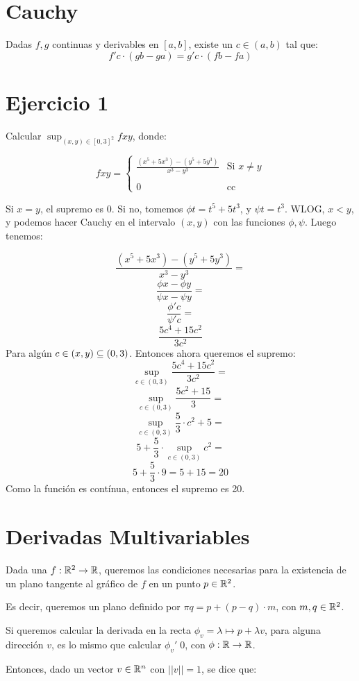\documentclass{article}
\begin{document}
\section*{Cauchy}
Dadas $f, g$ continuas y derivables en $[a, b]$, existe un $c \in (a, b)$ tal
que:
\[f'c \cdot (gb - ga) = g'c \cdot (fb - fa)\]

\section*{Ejercicio 1}
Calcular $\sup_{(x,y) \in [0,3]^2} fxy$, donde:

\[
	fxy =
	\begin{cases}
		\frac{(x^5 + 5x^3) - (y^5 + 5y^3)}{x^3 - y^3} & \text{Si $x \neq y$} \\
		\\
		0 & \text{cc}
	\end{cases}
\]

Si $x = y$, el supremo es $0$. Si no, tomemos $\phi t = t^5+5t^3$, y $\psi t =
t^3$. WLOG, $x < y$, y podemos hacer Cauchy en el intervalo $(x, y)$ con las
funciones $\phi, \psi$. Luego tenemos:

\[
	\frac{(x^5 + 5x^3) - (y^5 + 5y^3)}{x^3 - y^3} =
\]
\[
	\frac{\phi x - \phi y}{\psi x - \psi y} =
\]
\[
	\frac{\phi' c}{\psi' c} =
\]
\[
	\frac{5c^4+15c^2}{3c^2}
\]
Para algún $c \in (x, y) \subseteq (0, 3)$. Entonces ahora queremos el supremo:
\[
	\sup_{c \in (0,3)}\frac{5c^4+15c^2}{3c^2} =
\]
\[
	\sup_{c \in (0,3)}\frac{5c^2+15}{3} =
\]
\[
	\sup_{c \in (0,3)}\frac{5}{3} \cdot c^2 + 5 =
\]
\[
	5 + \frac{5}{3} \cdot \sup_{c \in (0,3)} c^2 =
\]
\[
	5 + \frac{5}{3} \cdot 9 = 5 + 15 = 20
\]
Como la función es contínua, entonces el supremo es 20.

\section*{Derivadas Multivariables}
Dada una $f : \mathbb{R}^2 \to \mathbb{R}$, queremos las condiciones necesarias para la
existencia de un plano tangente al gráfico de $f$ en un punto $p \in \mathbb{R}^2$.

Es decir, queremos un plano definido por $\pi q = p + (p-q) \cdot m$, con $m, q
\in \mathbb{R}^2$.

Si queremos calcular la derivada en la recta $\phi_v = \lambda \mapsto p +
\lambda v$, para alguna dirección $v$, es lo mismo que calcular
$\phi_v' \; 0$, con $\phi : \mathbb{R} \to \mathbb{R}$.

Entonces, dado un vector $v \in \mathbb{R}^n$ con $||v|| = 1$, se dice que:
\end{document}
